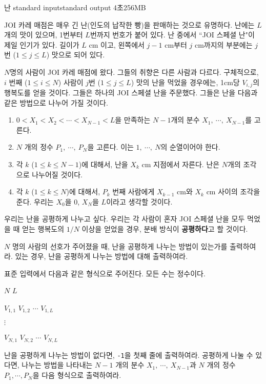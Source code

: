 \begin{problem}{난}
	{standard input}{standard output}
	{4초}{256MB}{}
	
	JOI 카레 매점은 매우 긴 난(인도의 납작한 빵)을 판매하는 것으로 유명하다. 난에는 $L$ 개의 맛이 있으며, 1번부터 $L$번까지 번호가 붙어 있다. 난 중에서 ``JOI 스페셜 난"이 제일 인기가 있다. 길이가 $L$ cm 이고, 왼쪽에서 $j-1$ cm부터 $j$ cm까지의 부분에는 $j$번 ($1\le j \le L$) 맛으로 되어 있다.
	
	$N$명의 사람이 JOI 카레 매점에 왔다. 그들의 취향은 다른 사람과 다르다. 구체적으로, $i$ 번째 ($1 \le i \le N$) 사람이 $j$번 ($1 \le j \le L$) 맛의 난을 먹었을 경우에는, 1cm당 $V_{i, j}$의 행복도를 얻을 것이다.
	그들은 하나의 JOI 스페셜 난을 주문했다. 그들은 난을 다음과 같은 방법으로 나누어 가질 것이다.
	
	\begin{enumerate}
		\item $0 < X_1 < X_2 < \cdots < X_{N-1} < L$을 만족하는 $N-1$개의 분수 $X_1,\ \cdots,\ X_{N-1}$를 고른다.
		\item $N$ 개의 정수 $P_1,\ \cdots, \ P_N$을 고른다. 이는 $1, \ \cdots, \ N$의 순열이어야 한다.
		\item 각 $k$ ($1 \le k \le N-1$)에 대해서, 난을 $X_k$ cm 지점에서 자른다. 난은 $N$개의 조각으로 나누어질 것이다.
		\item 각 $k$ ($1 \le k \le N$)에 대해서, $P_k$ 번째 사람에게 $X_{k-1}$ cm와 $X_k$ cm 사이의 조각을 준다. 우리는 $X_0$을 0, $X_N$을 $L$이라고 생각할 것이다.
	\end{enumerate}

	우리는 난을 공평하게 나누고 싶다. 우리는 각 사람이 혼자 JOI 스페셜 난을 모두 먹었을 때 얻는 행복도의 $1/N$ 이상을 얻었을 경우, 분배 방식이 \textbf{공평하다}고 할 것이다.
	
	$N$ 명의 사람의 선호가 주어졌을 때, 난을 공평하게 나누는 방법이 있는가를 출력하여라. 있는 경우, 난을 공평하게 나누는 방법에 대해 출력하여라.
	
	\InputFile
	
	표준 입력에서 다음과 같은 형식으로 주어진다. 모든 수는 정수이다.
	
	$N$ $L$
	
	$V_{1,1}$ $V_{1, 2}$ $\cdots$ $V_{1, L}$
	
	$\vdots$
	
	$V_{N,1}$ $V_{N, 2}$ $\cdots$ $V_{N, L}$
	
	\OutputFile
	
	난을 공평하게 나누는 방법이 없다면, \texttt{-1}을 첫째 줄에 출력하여라. 공평하게 나눌 수 있다면, 나누는 방법을 나타내는 $N-1$ 개의 분수 $X_1,\ \cdots,\ X_{N-1}$과 $N$ 개의 정수 $P_1, \cdots, P_N$을 다음 형식으로 출력하여라.
	

\end{problem}

